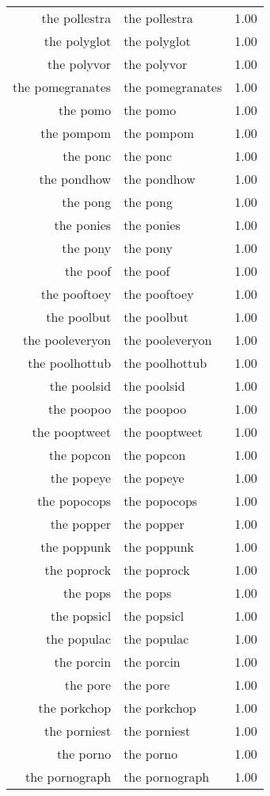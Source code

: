 \begin{table}[ht]
\begin{tabular}{rlr}
  the pollestra & the pollestra & 1.00 \\ 
  the polyglot & the polyglot & 1.00 \\ 
  the polyvor & the polyvor & 1.00 \\ 
  the pomegranates & the pomegranates & 1.00 \\ 
  the pomo & the pomo & 1.00 \\ 
  the pompom & the pompom & 1.00 \\ 
  the ponc & the ponc & 1.00 \\ 
  the pondhow & the pondhow & 1.00 \\ 
  the pong & the pong & 1.00 \\ 
  the ponies & the ponies & 1.00 \\ 
  the pony & the pony & 1.00 \\ 
  the poof & the poof & 1.00 \\ 
  the pooftoey & the pooftoey & 1.00 \\ 
  the poolbut & the poolbut & 1.00 \\ 
  the pooleveryon & the pooleveryon & 1.00 \\ 
  the poolhottub & the poolhottub & 1.00 \\ 
  the poolsid & the poolsid & 1.00 \\ 
  the poopoo & the poopoo & 1.00 \\ 
  the pooptweet & the pooptweet & 1.00 \\ 
  the popcon & the popcon & 1.00 \\ 
  the popeye & the popeye & 1.00 \\ 
  the popocops & the popocops & 1.00 \\ 
  the popper & the popper & 1.00 \\ 
  the poppunk & the poppunk & 1.00 \\ 
  the poprock & the poprock & 1.00 \\ 
  the pops & the pops & 1.00 \\ 
  the popsicl & the popsicl & 1.00 \\ 
  the populac & the populac & 1.00 \\ 
  the porcin & the porcin & 1.00 \\ 
  the pore & the pore & 1.00 \\ 
  the porkchop & the porkchop & 1.00 \\ 
  the porniest & the porniest & 1.00 \\ 
  the porno & the porno & 1.00 \\ 
  the pornograph & the pornograph & 1.00 \\ 

\end{tabular}
\end{table}

